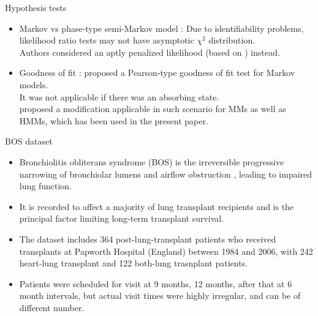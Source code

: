 \documentclass{beamer}
\begin{document}
\begin{frame}{Hypothesis tests}
\begin{itemize}
\item Markov vs phase-type semi-Markov model : Due to identifiability problems, likelihood ratio tests may not have asymptotic $\chi^2$ distribution. \\ \vspace{2mm} Authors considered an aptly penalized likelihood (based on \cite{chen2001modified}) instead.

\item Goodness of fit : \cite{aguirre2002pearson} proposed a Pearson-type goodness of fit test for Markov models.\\  \vspace{2mm} It was not applicable if there was an absorbing state. \\  \vspace{2mm}\cite{titman2008general} proposed a modification applicable in such scenario for MMs as well as HMMs, which has been used in the present paper.
\end{itemize}
\end{frame}

\begin{frame}{BOS dataset}
\begin{itemize}
\item Bronchiolitis obliterans syndrome (BOS) is the irreversible progressive narrowing of bronchiolar lumens and airflow obstruction \citep{todd2011bronchiolitis}, leading to impaired lung function.
\vspace{2mm}
\item It is recorded to affect a majority of lung transplant recipients and is the principal factor limiting long-term transplant survival.
\vspace{2mm}
\item The dataset includes 364 post-lung-transplant patients who received transplants at Papworth Hospital (England) between 1984 and 2006, with 242 heart-lung transplant and 122 both-lung trasnplant patients. 
\vspace{2mm}
\item Patients were scheduled for visit at 9 months, 12 months, after that at 6 month intervals, but actual visit times were highly irregular, and can be of different number.
\end{itemize}
\end{frame}
\end{document}

